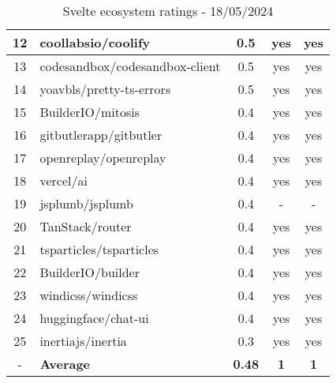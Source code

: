 \begin{table}[H]
{\begin{tabular}{|c|l|c|c|c|}
            12 & coollabsio/coolify             & 0.5                & yes                        & yes                \\ \hline
            13 & codesandbox/codesandbox-client & 0.5                & yes                        & yes                \\ \hline
            14 & yoavbls/pretty-ts-errors       & 0.5                & yes                        & yes                \\ \hline
            15 & BuilderIO/mitosis              & 0.4                & yes                        & yes                \\ \hline
            16 & gitbutlerapp/gitbutler         & 0.4                & yes                        & yes                \\ \hline
            17 & openreplay/openreplay          & 0.4                & yes                        & yes                \\ \hline
            18 & vercel/ai                      & 0.4                & yes                        & yes                \\ \hline
            19 & jsplumb/jsplumb                & 0.4                & -                          & -                  \\ \hline
            20 & TanStack/router                & 0.4                & yes                        & yes                \\ \hline
            21 & tsparticles/tsparticles        & 0.4                & yes                        & yes                \\ \hline
            22 & BuilderIO/builder              & 0.4                & yes                        & yes                \\ \hline
            23 & windicss/windicss              & 0.4                & yes                        & yes                \\ \hline
            24 & huggingface/chat-ui            & 0.4                & yes                        & yes                \\ \hline
            25 & inertiajs/inertia              & 0.3                & yes                        & yes                \\ \hline
            -  & \textbf{Average}               & \textbf{0.48}      & \textbf{1}                 & \textbf{1}         \\ \hline
        \end{tabular}
    }
    \caption{Svelte ecosystem ratings - 18/05/2024}
    \label{tab:metrics:svelte:ratings}
\end{table}


